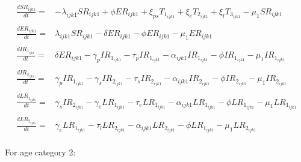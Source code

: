 \documentclass[a4paper]{article}
\begin{document}
 \begin{equation*}\label{agecat1-2}
	\begin{aligned}
          \frac{dSR_{ijk1}}{dt}={} & -\lambda_{ijk1} SR_{ijk1} + \phi ER_{ijk1} + \xi_{ps} T_{1_{ijk1}} + \xi_e T_{2_{ijk1}} + \xi_l T_{3_{ijk1}}  - \mu_1 SR_{ijk1}
   \\&\\
    \frac{dER_{ijk1}}{dt}={} & \lambda_{ijk1} SR_{ijk1} - \delta ER_{ijk1} -\phi ER_{ijk1} - \mu_1 ER_{ijk1}
     \\&\\
  \frac{dIR_{1_{ijk1}}}{dt}={} & \delta ER_{ijk1} - \gamma_p IR_{1_{ijk1}} - \tau_p IR_{1_{ijk1}} - \alpha_{ijk1} IR_{1_{ijk1}} -\phi IR_{1_{ijk1}}   - \mu_1 IR_{1_{ijk1}}
   \\&\\
  \frac{dIR_{2_{ijk1}}}{dt}={} & \gamma_p IR_{1_{ijk1}} - \gamma_s IR_{2_{ijk1}} - \tau_s IR_{2_{ijk1}} - \alpha_{ijk1} IR_{2_{ijk1}} -\phi IR_{2_{ijk1}}   - \mu_1 IR_{2_{ijk1}}
     \\&\\
   \frac{dLR_{1_{ijk1}}}{dt}={} & \gamma_s IR_{2_{ijk1}} - \gamma_e LR_{1_{ijk1}} - \tau_e LR_{1_{ijk1}} - \alpha_{ijk1} LR_{1_{ijk1}} - \phi LR_{1_{ijk1}}   - \mu_1 LR_{1_{ijk1}}
     \\&\\
    \frac{dLR_{2_{ijk1}}}{dt}={} & \gamma_e LR_{1_{ijk1}} - \tau_l LR_{2_{ijk1}} - \alpha_{ijk1} LR_{2_{ijk1}} -\phi LR_{1_{ijk1}}   - \mu_1 LR_{2_{ijk1}}
 \end{aligned}
 \end{equation*}
\\ 
For age category 2:
\end{document}
